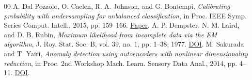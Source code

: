 \documentclass[conference]{IEEEtran}
\begin{document}
\begin{thebibliography}{00}
A. Dal Pozzolo, O. Caelen, R. A. Johnson, and G. Bontempi, \emph{Calibrating probability with undersampling for unbalanced classification}, in Proc. IEEE Symp. Series Comput. Intell., 2015, pp. 159--166. \href{https://www3.nd.edu/~dial/publications/dalpozzolo2015calibrating.pdf}{Paper}.
A. P. Dempster, N. M. Laird, and D. B. Rubin, \emph{Maximum likelihood from incomplete data via the EM algorithm}, J. Roy. Stat. Soc. B, vol. 39, no. 1, pp. 1--38, 1977. \href{https://doi.org/10.1111/j.2517-6161.1977.tb01600.x}{DOI}.
M. Sakurada and T. Yairi, \emph{Anomaly detection using autoencoders with nonlinear dimensionality reduction}, in Proc. 2nd Workshop Mach. Learn. Sensory Data Anal., 2014, pp. 4--11. \href{https://doi.org/10.1145/2689746.2689747}{DOI}.
\end{thebibliography}
\end{document}

